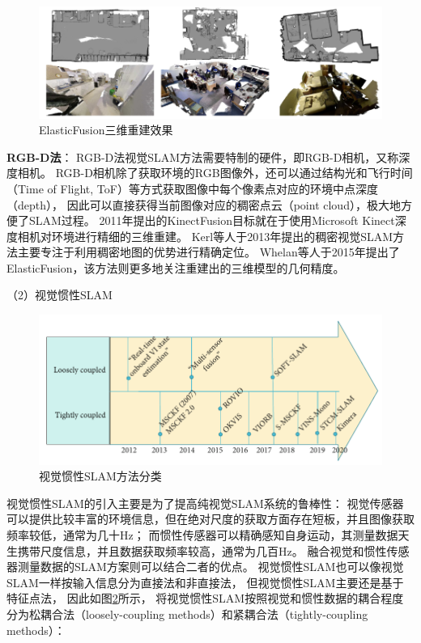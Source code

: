 \begin{figure}[htbp]
    \centering
    \includegraphics[width = \textwidth]{figures/elastic_fusion_demo.png}
    \caption{ElasticFusion三维重建效果\cite{whelan2015elasticfusion}}
    \label{fig:elastic_fusion_demo}
\end{figure}
\textbf{RGB-D法}：
RGB-D法视觉SLAM方法需要特制的硬件，即RGB-D相机，又称深度相机。
RGB-D相机除了获取环境的RGB图像外，还可以通过结构光和飞行时间（Time of Flight, ToF）等方式获取图像中每个像素点对应的环境中点深度（depth），
因此可以直接获得当前图像对应的稠密点云（point cloud），极大地方便了SLAM过程。
2011年提出的KinectFusion\cite{newcombe2011kinectfusion}目标就在于使用Microsoft Kinect深度相机对环境进行精细的三维重建。
Kerl等人于2013年提出的稠密视觉SLAM方法\cite{kerl2013dense}主要专注于利用稠密地图的优势进行精确定位。
Whelan等人于2015年提出了ElasticFusion\cite{whelan2015elasticfusion}，该方法则更多地关注重建出的三维模型的几何精度。

（2）视觉惯性SLAM

\begin{figure}[htbp]
    \centering
    \includegraphics[width = \textwidth]{figures/vislam_classification.png}
    \caption{视觉惯性SLAM方法分类\cite{servieres2021visual}}
    \label{fig:vislam_classification}
\end{figure}

视觉惯性SLAM的引入主要是为了提高纯视觉SLAM系统的鲁棒性：
视觉传感器可以提供比较丰富的环境信息，但在绝对尺度的获取方面存在短板，并且图像获取频率较低，通常为几十Hz；
而惯性传感器可以精确感知自身运动，其测量数据天生携带尺度信息，并且数据获取频率较高，通常为几百Hz。
融合视觉和惯性传感器测量数据的SLAM方案则可以结合二者的优点。
视觉惯性SLAM也可以像视觉SLAM一样按输入信息分为直接法和非直接法，
但视觉惯性SLAM主要还是基于特征点法，
因此如图\ref{fig:vislam_classification}所示，
将视觉惯性SLAM按照视觉和惯性数据的耦合程度分为松耦合法（loosely-coupling methods）和紧耦合法（tightly-coupling methods）\cite{servieres2021visual}：

